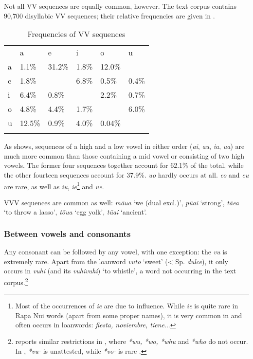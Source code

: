 Not all VV sequences are equally common, however. The text corpus contains 90,700 disyllabic VV sequences; their relative frequencies are given in .

\begin{table} 
\begin{tabularx}{\textwidth}{XR{1.8cm}R{1.5cm}R{1.8cm}R{1.8cm}R{2cm}}
\lsptoprule

 & \parbox{1cm}{\centering a}& \parbox{1cm}{\centering e}& \parbox{1cm}{\centering i}& \parbox{1cm}{\centering o}& \parbox{1cm}{\centering u}\\
{ a}  &  1.1\%&  31.2\%&  1.8\%&  12.0\%\\
{ e}  &  1.8\%&  &  6.8\%&  0.5\%&  0.4\%\\
{ i}  &  6.4\%&  0.8\%&  &  2.2\%&  0.7\%\\
{ o}  &  4.8\%&  4.4\%&  1.7\%&  &  6.0\%\\
{ u}  &  12.5\%&  0.9\%&  4.0\%&  0.04\%& \\
\lspbottomrule
\end{tabularx}
\caption{Frequencies of VV sequences}
\label{tab:9}
\end{table}

As  shows, sequences of a high and a low vowel in either order (\textit{ai}, \textit{au}, \textit{ia}, \textit{ua}) are much more common than those containing a mid vowel or consisting of two high vowels. The former four sequences together account for 62.1\% of the total, while the other fourteen sequences account for 37.9\%. \textit{uo} hardly occurs at all. \textit{eo} and \textit{eu} are rare, as well as \textit{iu}, \textit{ie}\footnote{\label{fn:53}Most of the occurrences of \textit{ie} are due to  influence. While \textit{ie} is quite rare in Rapa Nui words (apart from some proper names), it is very common in  and often occurs in loanwords: \textit{fiesta, noviembre, tiene}...} and \textit{ue}. 

VVV sequences are common as well: \textit{māua} ‘we (dual excl.)’, \textit{pūai} ‘strong’, \textit{tāea} ‘to throw a lasso’, \textit{tōua} ‘egg yolk’, \textit{tūai} ‘ancient’.

\subsubsection{Between vowels and consonants}\label{sec:2.3.3.2}

Any consonant can be followed by any vowel, with one exception: the  \textit{vu} is extremely rare. Apart from the loanword \textit{vuto} ‘sweet’ ({\textless} Sp. \textit{dulce}), it only occurs in \textit{vuhi} (and its  \textit{vuhivuhi}) ‘to whistle’, a word not occurring in the text corpus.\footnote{\label{fn:54}\citet{DeLacy1997} reports similar restrictions in , where \textit{*wu, *wo, *whu} and \textit{*who} do not occur. In , \textit{*vu-} is unattested, while \textit{*vo-} is rare \citep[612]{Besnier2000}.} 

